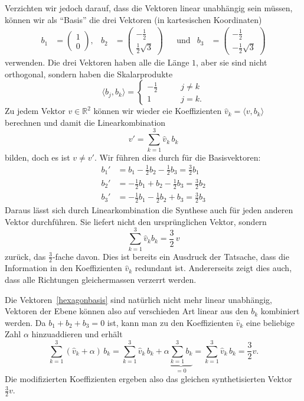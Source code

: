 Verzichten wir jedoch darauf, dass die Vektoren linear unabhängig sein müssen,
können wir als ``Basis'' die drei Vektoren (in kartesischen Koordinaten)
\begin{equation}
\begin{aligned}
b_1
&=
\begin{pmatrix}1\\0\end{pmatrix},
&
b_2
&=
\begin{pmatrix}-\frac12\\\frac12\sqrt{3}\end{pmatrix}
&&\text{und}
&
b_3
&=
\begin{pmatrix}-\frac12\\-\frac12\sqrt{3}\end{pmatrix}
\end{aligned}
\label{hexagonbasis}
\end{equation}
verwenden.
Die drei Vektoren haben alle die Länge $1$, aber sie sind nicht
orthogonal, sondern haben die Skalarprodukte
\[
\langle b_j,b_k\rangle
=
\begin{cases}
-\frac12&\qquad j\ne k\\
1&\qquad j=k.
\end{cases}
\]
Zu jedem Vektor $v\in\mathbb R^2$ können wir wieder eie Koeffizienten
$\hat{v}_k=\langle v,b_k\rangle$ berechnen und damit die Linearkombination
\[
v' = \sum_{k=1}^3 \hat{v}_k\,b_k
\]
bilden,
doch es ist $v\ne v'$.
Wir führen dies durch für die Basisvektoren:
\begin{align*}
b_1'
&=
b_1 - \frac12 b_2 - \frac 12 b_3
=
\frac32b_1
\\
b_2'
&=
-\frac12 b_1 + b_2 -\frac12 b_3
=
\frac32b_2
\\
b_3'
&=
-\frac12b_1-\frac12 b_2 + b_3
=
\frac32b_3
\end{align*}
Daraus lässt sich durch Linearkombination die Synthese auch für jeden
anderen Vektor durchführen.
Sie liefert nicht den ursprünglichen Vektor, sondern
\begin{equation}
\sum_{k=1}^3 \hat{v}_k b_k = \frac32\,v
\label{geometrie:32beispiel}
\end{equation}
zurück, das $\frac32$-fache davon.
Dies ist bereits ein Ausdruck der Tatsache, dass die Information in den
Koeffizienten $\hat{v}_k$ redundant ist.
Andererseits zeigt dies auch, dass alle Richtungen gleichermassen
verzerrt werden.

Die Vektoren~\eqref{hexagonbasis}
sind natürlich nicht mehr linear unabhängig, Vektoren
der Ebene können also auf verschieden Art linear aus den $b_k$ kombiniert
werden.
Da $b_1+b_2+b_3=0$ ist, kann man zu den Koeffizienten $\hat{v}_k$
eine beliebige Zahl $\alpha$ hinzuaddieren und erhält
\[
\sum_{k=1}^3 (\hat{v}_k+\alpha)\, b_k
=
\sum_{k=1}^3 \hat{v}_k\,b_k
+\alpha
\underbrace{ \sum_{k=1}^3 b_k}_{\displaystyle=0}
=
\sum_{k=1}^3 \hat{v}_k\,b_k
=
\frac32 v.
\]
Die modifizierten Koeffizienten ergeben also das gleichen synthetisierten
Vektor $\frac32 v$.

